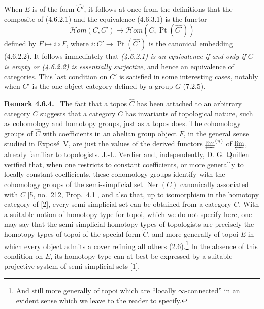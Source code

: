 \documentclass[11pt]{article}
\newcommand{\Ner}{\operatorname{Ner}}
\newcommand{\Ppoints}{\operatorname{Pt}}
\newcommand{\Hhom}{\mathcal{H}om}
\newenvironment{remarktext}[1]{\par\medskip\noindent\textbf{#1.}\ }{\par\medskip}
\begin{document}
When \(E\) is of the form \(\widehat{C'}\), it follows at once from the definitions that the composite of (4.6.2.1) and the equivalence (4.6.3.1) is the functor
\[
\Hhom(C,C')\longrightarrow\Hhom(C,\Ppoints(\widehat{C'}))\tag{4.6.3.2}
\]
defined by \(F\mapsto i\circ F\), where \(i:C'\to\Ppoints(\widehat{C'})\) is the canonical embedding (4.6.2.2). It follows immediately that \emph{(4.6.2.1) is an equivalence if and only if \(C\) is empty or (4.6.2.2) is essentially surjective}, and hence an equivalence of categories. This last condition on \(C'\) is satisfied in some interesting cases, notably when \(C'\) is the one-object category defined by a group \(G\) (7.2.5).

\begin{remarktext}{Remark 4.6.4}
The fact that a topos \(\widehat C\) has been attached to an arbitrary category \(C\) suggests that a category \(C\) has invariants of topological nature, such as cohomology and homotopy groups, just as a topos does. The cohomology groups of \(\widehat C\) with coefficients in an abelian group object \(F\), in the general sense studied in Expos\'e~V, are just the values of the derived functors \(\varprojlim^{(n)}\) of \(\varprojlim\), already familiar to topologists. J.-L. Verdier and, independently, D. G. Quillen verified that, when one restricts to constant coefficients, or more generally to locally constant coefficients, these cohomology groups identify with the cohomology groups of the semi-simplicial set \(\Ner(C)\) canonically associated with \(C\) [5, no.~212, Prop.~4.1], and also that, up to isomorphism in the homotopy category of [2], every semi-simplicial set can be obtained from a category \(C\). With a suitable notion of homotopy type for topoi, which we do not specify here, one may say that the semi-simplicial homotopy types of topologists are precisely the homotopy types of topoi of the special form \(\widehat C\), and more generally of topoi \(E\) in which every object admits a cover refining all others (2.6).\footnote{And still more generally of topoi which are ``locally \(\infty\)-connected'' in an evident sense which we leave to the reader to specify.} In the absence of this condition on \(E\), its homotopy type can at best be expressed by a suitable projective system of semi-simplicial sets [1].
\end{remarktext}
\end{document}
